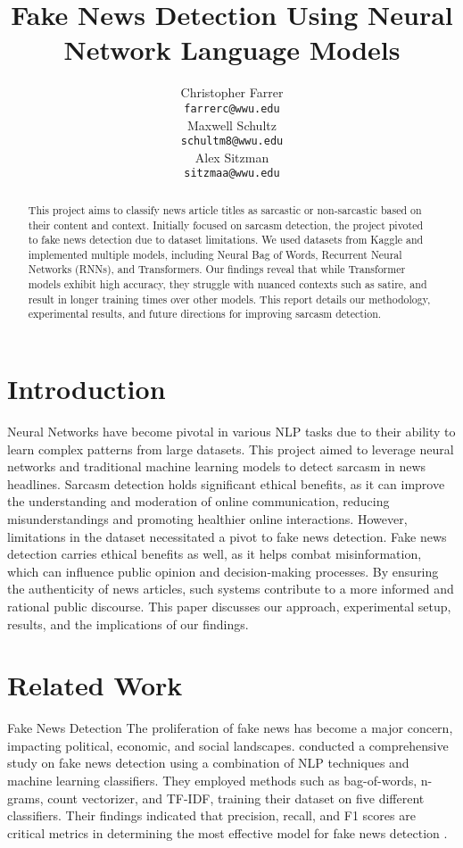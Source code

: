 \documentclass[11pt]{article}
\title{Fake News Detection Using Neural Network Language Models}
\author{Christopher Farrer \\
  \texttt{farrerc@wwu.edu} \\\And
  Maxwell Schultz \\
  \texttt{schultm8@wwu.edu} \\\And
  Alex Sitzman \\
  \texttt{sitzmaa@wwu.edu} \\}
\begin{document}
\maketitle
\begin{abstract}
This project aims to classify news article titles as sarcastic or non-sarcastic based on their content and context. Initially focused on sarcasm detection, the project pivoted to fake news detection due to dataset limitations. We used datasets from Kaggle and implemented multiple models, including Neural Bag of Words, Recurrent Neural Networks (RNNs), and Transformers. Our findings reveal that while Transformer models exhibit high accuracy, they struggle with nuanced contexts such as satire, and result in longer training times over other models. This report details our methodology, experimental results, and future directions for improving sarcasm detection.
\end{abstract}

\section{Introduction}

Neural Networks have become pivotal in various NLP tasks due to their ability to learn complex patterns from large datasets. This project aimed to leverage neural networks and traditional machine learning models to detect sarcasm in news headlines. Sarcasm detection holds significant ethical benefits, as it can improve the understanding and moderation of online communication, reducing misunderstandings and promoting healthier online interactions. However, limitations in the dataset necessitated a pivot to fake news detection. Fake news detection carries ethical benefits as well, as it helps combat misinformation, which can influence public opinion and decision-making processes. By ensuring the authenticity of news articles, such systems contribute to a more informed and rational public discourse. This paper discusses our approach, experimental setup, results, and the implications of our findings.

\section{Related Work}


Fake News Detection
The proliferation of fake news has become a major concern, impacting political, economic, and social landscapes. \cite{Agarwal2019} conducted a comprehensive study on fake news detection using a combination of NLP techniques and machine learning classifiers. They employed methods such as bag-of-words, n-grams, count vectorizer, and TF-IDF, training their dataset on five different classifiers. Their findings indicated that precision, recall, and F1 scores are critical metrics in determining the most effective model for fake news detection .
\end{document}
